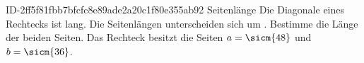 \begin{exercise}
      {ID-2ff5f81fbb7bfcfc8e89ade2a20c1f80e355ab92}
      {Seitenlänge}
  \ifproblem\problem
    Die Diagonale eines Rechtecks ist  lang.
    Die Seitenlängen unterscheiden sich um .
    Bestimme die Länge der beiden Seiten.
  \fi
  \ifoutcome\outcome
    Das Rechteck besitzt die Seiten $a=\sicm{48}$ und $b=\sicm{36}$.
  \fi
\end{exercise}
